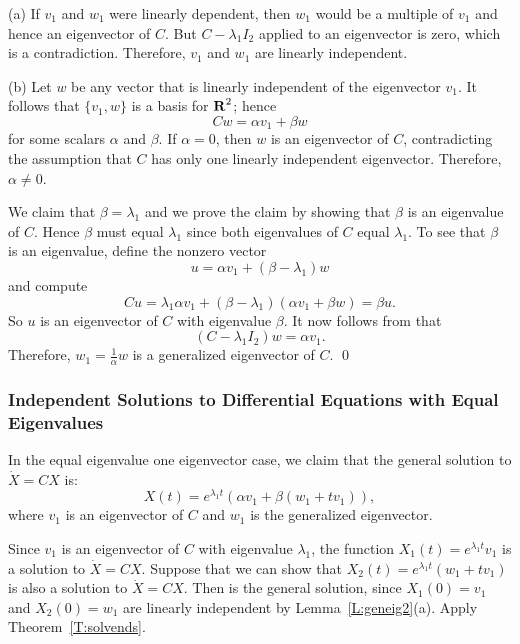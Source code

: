 \proof  (a) If $v_1$ and $w_1$ were linearly dependent, then $w_1$ would be 
a multiple of $v_1$ and hence an eigenvector of $C$.  But $C-\lambda_1I_2$
applied to an eigenvector is zero, which is a contradiction.  Therefore, 
$v_1$ and $w_1$ are linearly independent.

(b) Let $w$ be any vector that is linearly independent of
the eigenvector $v_1$.  It follows that  $\{v_1,w\}$ is a basis for
$\mbox{$\bf{R}$}^2$; hence
\begin{equation} \label{E:Cw1}
Cw = \alpha v_1 + \beta w
\end{equation}
for some scalars $\alpha$ and $\beta$.    If $\alpha=0$, then
$w$ is an eigenvector of $C$, contradicting the assumption that $C$ has
only one linearly independent eigenvector.  Therefore, $\alpha\neq 0$.

We claim that $\beta=\lambda_1$ and we prove the claim by showing that
$\beta$ is an eigenvalue of $C$.  Hence $\beta$ must equal $\lambda_1$
since both eigenvalues of $C$ equal $\lambda_1$.  To see that $\beta$
is an eigenvalue, define the nonzero vector
\[
u = \alpha v_1 +(\beta-\lambda_1)w
\]
and compute
\[
Cu = \lambda_1 \alpha v_1 + (\beta-\lambda_1)(\alpha v_1+\beta w) =
\beta u.
\]
So $u$ is an eigenvector of $C$ with eigenvalue $\beta$.
It now follows from  that
\[
(C-\lambda_1I_2)w = \alpha v_1.
\]
Therefore, $w_1=\frac{1}{\alpha}w$ is a generalized eigenvector
of $C$.  \qed



\subsubsection*{Independent Solutions to Differential Equations with
Equal Eigenvalues}

In the equal eigenvalue one eigenvector case, we
claim that the general solution to $\dot{X}=CX$ is:
\begin{equation}  \label{e:exp1eva}
X(t) = e^{\lambda_1 t}\left(\alpha v_1 +\beta (w_1+tv_1)\right),
\end{equation}
where $v_1$ is an eigenvector of $C$ and $w_1$ is the generalized
eigenvector.

Since $v_1$ is an eigenvector of $C$ with eigenvalue $\lambda_1$, the
function $X_1(t)=e^{\lambda_1 t}v_1$ is a solution to $\dot{X}=CX$.  Suppose
that we can show that $X_2(t)=e^{\lambda_1 t}(w_1+tv_1)$ is also a solution
to $\dot{X}=CX$.  Then  is the general solution, since
$X_1(0)=v_1$ and $X_2(0)=w_1$ are linearly independent by 
Lemma~\ref{L:geneig2}(a).  Apply Theorem~\ref{T:solvends}.

